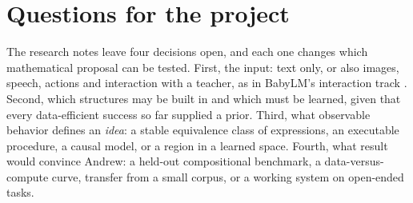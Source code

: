 \section{Questions for the project}
The research notes leave four decisions open, and each one changes which mathematical proposal can be tested. First, the input: text only, or also images, speech, actions and interaction with a teacher, as in BabyLM's interaction track \cite{post88}. Second, which structures may be built in and which must be learned, given that every data-efficient success so far supplied a prior. Third, what observable behavior defines an \emph{idea}: a stable equivalence class of expressions, an executable procedure, a causal model, or a region in a learned space. Fourth, what result would convince Andrew: a held-out compositional benchmark, a data-versus-compute curve, transfer from a small corpus, or a working system on open-ended tasks.

